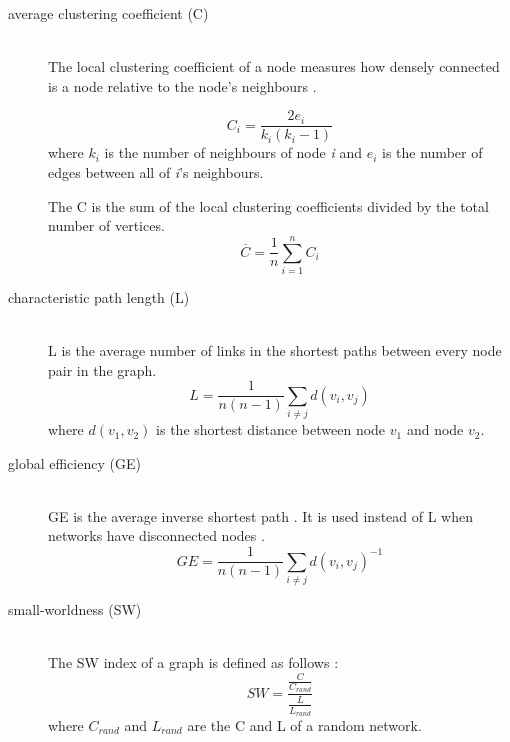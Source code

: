 		\begin{description}
			  \item[average clustering coefficient (C)] \hfill \\
			  The local clustering coefficient of a node measures how densely connected is a node relative to the node's neighbours \autocite{Watts1998}.

			  \begin{equation}\label{eq:local-clust}
				C_i = \frac{2 e_i}{k_{i}(k_{i}-1)}
			  \end{equation}
			  where \(k_i\) is the number of neighbours of node \textit{i} and \(e_i\) is the number of edges between all of \textit{i}'s neighbours.

			  The \ac{C} is the sum of the local clustering coefficients divided by the total number of vertices. 
			  \begin{equation}\label{eq:avg-clust}
				\overline{C} = \frac{1}{n} \sum\limits_{i=1}^n C_i
			  \end{equation}
			  
			  \item[characteristic path length (L)] \hfill \\
			  \ac{L} is the average number of links in the shortest paths between every node pair in the graph.
			  \begin{equation}\label{eq:char-path-len}
				L = \frac{1}{n (n-1)} \sum\limits_{i\not=j} d(v_i, v_j)
			  \end{equation} 
			  where \(d(v_1, v_2)\) is the shortest distance between node \(v_1\) and  node \(v_2\).

			  \item[global efficiency (GE)] \hfill \\
			  \ac{GE} is the average inverse shortest path \autocite{Latora2001}. It is used instead of \ac{L} when networks have disconnected nodes \autocite{Fallani2014}.
			  \begin{equation}\label{eq:ge}
				GE = \frac{1}{n (n-1)} \sum\limits_{i\not=j} d(v_i, v_j)^{-1}
			  \end{equation} 
			  
			  \item[small-worldness (SW)] \hfill \\
			  The \ac{SW} index of a graph is defined as follows \autocite{Watts1998}:
			  \begin{equation}\label{eq:sw}		
				SW = \frac{ \frac{C}{ C_{rand} } }{ \frac{L}{ L_{rand} } }
			  \end{equation}
			  where \(C_{rand}\) and \(L_{rand}\) are the \ac{C} and \ac{L} of a random network.


\end{description}
